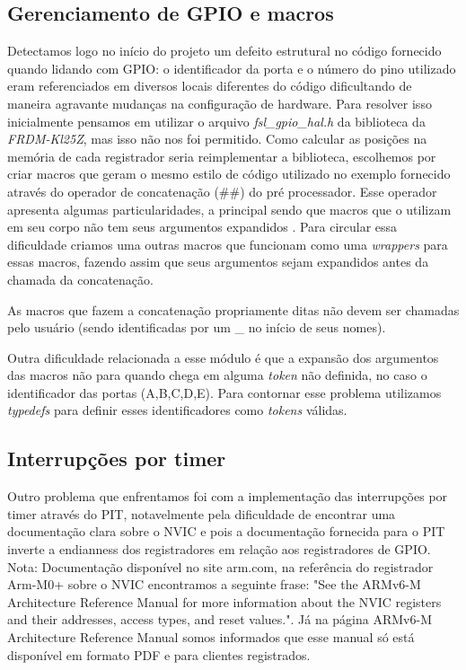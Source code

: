 \documentclass{article}
\begin{document}
\subsection{Gerenciamento de GPIO e macros}
Detectamos logo no início do projeto um defeito estrutural no código fornecido quando lidando com GPIO: o identificador da porta e o número do pino utilizado eram referenciados em diversos locais diferentes do código dificultando de maneira agravante mudanças na configuração de hardware. Para resolver isso inicialmente pensamos em utilizar o arquivo \textit{fsl\_gpio\_hal.h} da biblioteca da \textit{FRDM-Kl25Z}, mas isso não nos foi permitido. Como calcular as posições na memória de cada registrador seria reimplementar a biblioteca, escolhemos por criar macros que geram o mesmo estilo de código utilizado no exemplo fornecido através do operador de concatenação (\#\#) do pré processador. Esse operador apresenta algumas particularidades, a principal sendo que macros que o utilizam em seu corpo não tem seus argumentos expandidos \cite{bb:preprocessor}. Para circular essa dificuldade criamos uma outras macros que funcionam como uma \textit{wrappers} para essas macros, fazendo assim que seus argumentos sejam expandidos antes da chamada da concatenação. 

As macros que fazem a concatenação propriamente ditas não devem ser chamadas pelo usuário (sendo identificadas por um \_ no início de seus nomes).

Outra dificuldade relacionada a esse módulo é que a expansão dos argumentos das macros não para quando chega em alguma \textit{token} não definida, no caso o identificador das portas (A,B,C,D,E). Para contornar esse problema utilizamos \textit{typedefs} para definir esses identificadores como \textit{tokens} válidas.

\subsection{Interrupções por timer}
Outro problema que enfrentamos foi com a implementação das interrupções por timer através do PIT, notavelmente pela dificuldade de encontrar uma documentação clara sobre o NVIC e pois a documentação fornecida para o PIT inverte a endianness dos registradores em relação aos registradores de GPIO.
Nota: Documentação disponível no site arm.com, na referência do registrador Arm-M0+ sobre o NVIC \cite{bb:armnvic} encontramos a seguinte frase: "See the ARMv6-M Architecture Reference Manual for more information about the NVIC registers and their addresses, access types, and reset values.". Já na página ARMv6-M Architecture Reference Manual \cite{bb:armarm} somos informados que esse manual só está disponível em formato PDF e para clientes registrados.
\end{document}
